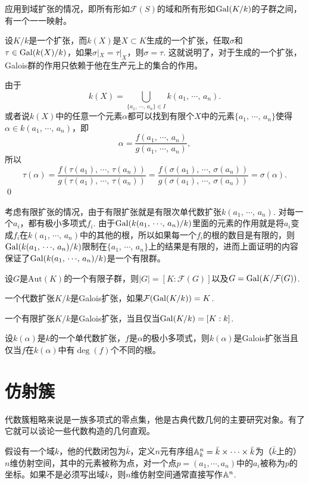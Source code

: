 应用到域扩张的情况，即所有形如$\mathcal{F}(S)$的域和所有形如$\operatorname{Gal}(K/k)$的子群之间，有一个一一映射。

\para 设$K/k$是一个扩张，而$k(X)$是$X\subset K$生成的一个扩张，任取$\sigma$和$\tau\in \operatorname{Gal}(k(X)/k)$，如果$\sigma|_X=\tau|_X$，则$\sigma=\tau$. 这就说明了，对于生成的一个扩张，Galois群的作用只依赖于他在生产元上的集合的作用。

\proof 
	由于\[
		k(X)=\bigcup_{\{a_1,\,\cdots\!,\,a_n\}\in I} k(a_1,\,\cdots\!,\,a_n).
	\]
	或者说$k(X)$中的任意一个元素$\alpha$都可以找到有限个$X$中的元素$\{a_1,\,\cdots\!,\,a_n\}$使得$\alpha\in k(a_1,\,\cdots\!,\,a_n)$，即
	\[
		\alpha=\frac{f(a_1,\,\cdots\!,\,a_n)}{g(a_1,\,\cdots\!,\,a_n)},
	\]
	所以
	\[
		\tau(\alpha)=\frac{f(\tau(a_1),\,\cdots\!,\,\tau(a_n))}{g(\tau(a_1),\,\cdots\!,\,\tau(a_n))}=\frac{f(\sigma(a_1),\,\cdots\!,\,\sigma(a_n))}{g(\sigma(a_1),\,\cdots\!,\,\sigma(a_n))}=\sigma(\alpha).
	\]
\qed

考虑有限扩张的情况，由于有限扩张就是有限次单代数扩张$k(a_1,\,\cdots\!,\,a_n)$. 对每一个$a_i$，都有极小多项式$f_i$. 由于$\operatorname{Gal}(k(a_1,\,\cdots\!,\,a_n)/k)$里面的元素的作用就是将$a_i$变成$f_i$在$k(a_1,\,\cdots\!,\,a_n)$中的其他的根，所以如果每一个$f_i$的根的数目是有限的，则$\operatorname{Gal}(k(a_1,\,\cdots\!,\,a_n)/k)$限制在$\{a_1,\,\cdots\!,\,a_n\}$上的结果是有限的，进而上面证明的内容保证了$\operatorname{Gal}(k(a_1,\,\cdots\!,\,a_n)/k)$是一个有限群。

\pro 设$G$是$\mathrm{Aut}(K)$的一个有限子群，则$|G|=[K:\mathcal{F}(G)]$以及$G=\operatorname{Gal}(K/\mathcal{F}(G))$.

\para 一个代数扩张$K/k$是Galois扩张，如果$\mathcal{F}(\operatorname{Gal}(K/k))=K$.

\pro 一个有限扩张$K/k$是Galois扩张，当且仅当$\operatorname{Gal}(K/k)=[K:k]$.

\pro 设$k(\alpha)$是$k$的一个单代数扩张，$f$是$\alpha$的极小多项式，则$k(\alpha)$是Galois扩张当且仅当$f$在$k(\alpha)$中有$\deg(f)$个不同的根。

\section{仿射簇}
\label{variety}

代数簇粗略来说是一族多项式的零点集，他是古典代数几何的主要研究对象。有了它就可以谈论一些代数构造的几何直观。

\para 假设有一个域$k$，他的代数闭包为$\bar{k}$，定义$n$元有序组$\mathbb{A}^n_k=\bar{k}\times \cdots \times \bar{k}$为（$\bar{k}$上的）$n$维仿射空间，其中的元素被称为点，对一个点$p=(a_1,\cdots ,a_n)$中的$a_i$被称为$p$的坐标。如果不是必须写出域$k$，则$n$维仿射空间通常直接写作$\mathbb{A}^n$.


